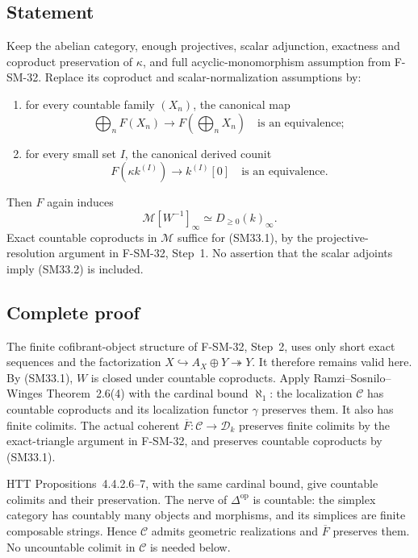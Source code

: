 \documentclass[11pt,a4paper]{article}
\theoremstyle{definition}\newtheorem{definition}[theorem]{Definition}
\theoremstyle{remark}\newtheorem{remark}[theorem]{Remark}
\begin{document}
\subsection{Statement}
Keep the abelian category, enough projectives, scalar adjunction,
exactness and coproduct preservation of \(\kappa\), and full
acyclic-monomorphism assumption from F-SM-32.  Replace its
coproduct and scalar-normalization assumptions by:
\begin{enumerate}
\item for every countable family \((X_n)\), the canonical map
\[
       \bigoplus_n F(X_n)\longrightarrow F(\bigoplus_nX_n)
                         \quad\text{is an equivalence};       \tag{SM33.1}
\]
\item for every small set \(I\), the canonical derived counit
\[
                  F(\kappa k^{(I)})\longrightarrow k^{(I)}[0]
                         \quad\text{is an equivalence}.       \tag{SM33.2}
\]
\end{enumerate}
Then \(F\) again induces
\[
                   \mathcal M[W^{-1}]_\infty\simeq D_{\ge0}(k)_\infty.
                                                               \tag{SM33.3}
\]
Exact countable coproducts in \(\mathcal M\) suffice for
(SM33.1), by the projective-resolution argument in
F-SM-32, Step~1.  No assertion that the scalar adjoints imply
(SM33.2) is included.

\subsection{Complete proof}
The finite cofibrant-object structure of F-SM-32, Step~2,
uses only short exact sequences and the factorization
\(X\hookrightarrow A_X\oplus Y\twoheadrightarrow Y\).
It therefore remains valid here.  By (SM33.1), \(W\) is
closed under countable coproducts.  Apply
Ramzi--Sosnilo--Winges Theorem~2.6(4) with the cardinal bound
\(\aleph_1\): the localization \(\mathcal C\) has countable
coproducts and its localization functor \(\gamma\) preserves
them.  It also has finite colimits.  The actual coherent
\(\overline F:\mathcal C\to\mathcal D_k\) preserves finite
colimits by the exact-triangle argument in F-SM-32, and
preserves countable coproducts by (SM33.1).

HTT Propositions~4.4.2.6--7, with the same cardinal bound,
give countable colimits and their preservation.  The nerve
of \(\Delta^{\mathrm{op}}\) is countable: the simplex
category has countably many objects and morphisms, and its
simplices are finite composable strings.  Hence
\(\mathcal C\) admits geometric realizations and
\(\overline F\) preserves them.  No uncountable colimit in
\(\mathcal C\) is needed below.
\end{document}
